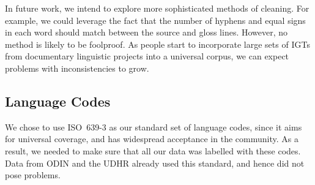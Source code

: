 


In future work, we intend to explore more sophisticated methods of cleaning.  For example, we could leverage the fact that the number of hyphens and equal signs in each word should match between the source and gloss lines.  However, no method is likely to be foolproof.  As people start to incorporate large sets of IGTs from documentary linguistic projects into a universal corpus, we can expect problems with inconsistencies to grow.

\subsection{Language Codes}

We chose to use ISO~639-3 as our standard set of language codes, since it aims for universal coverage, and has widespread acceptance in the community.  As a result, we needed to make sure that all our data was labelled with these codes.  Data from ODIN and the UDHR already used this standard, and hence did not pose problems.

